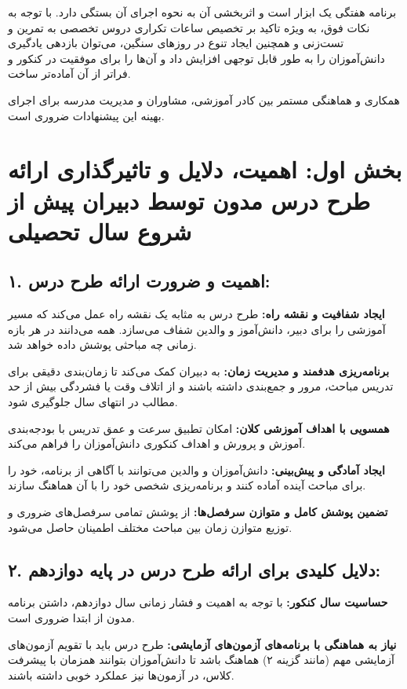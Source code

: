 \documentclass[a4paper,14pt]{article}
\begin{document}
برنامه هفتگی یک ابزار است و اثربخشی آن به نحوه اجرای آن بستگی دارد. با توجه به نکات فوق، به ویژه تاکید بر تخصیص ساعات تکراری دروس تخصصی به تمرین و تست‌زنی و همچنین ایجاد تنوع در روزهای سنگین، می‌توان بازدهی یادگیری دانش‌آموزان را به طور قابل توجهی افزایش داد و آن‌ها را برای موفقیت در کنکور و فراتر از آن آماده‌تر ساخت.

\medskip

همکاری و هماهنگی مستمر بین کادر آموزشی، مشاوران و مدیریت مدرسه برای اجرای بهینه این پیشنهادات ضروری است.
\newpage
\section*{بخش اول: اهمیت، دلایل و تاثیرگذاری ارائه طرح درس مدون توسط دبیران پیش از شروع سال تحصیلی}
\bigskip

\subsection*{۱. اهمیت و ضرورت ارائه طرح درس:}
\textbf{ایجاد شفافیت و نقشه راه:} طرح درس به مثابه یک نقشه راه عمل می‌کند که مسیر آموزشی را برای دبیر، دانش‌آموز و والدین شفاف می‌سازد. همه می‌دانند در هر بازه زمانی چه مباحثی پوشش داده خواهد شد.

\textbf{برنامه‌ریزی هدفمند و مدیریت زمان:} به دبیران کمک می‌کند تا زمان‌بندی دقیقی برای تدریس مباحث، مرور و جمع‌بندی داشته باشند و از اتلاف وقت یا فشردگی بیش از حد مطالب در انتهای سال جلوگیری شود.

\textbf{همسویی با اهداف آموزشی کلان:} امکان تطبیق سرعت و عمق تدریس با بودجه‌بندی آموزش و پرورش و اهداف کنکوری دانش‌آموزان را فراهم می‌کند.

\textbf{ایجاد آمادگی و پیش‌بینی:} دانش‌آموزان و والدین می‌توانند با آگاهی از برنامه، خود را برای مباحث آینده آماده کنند و برنامه‌ریزی شخصی خود را با آن هماهنگ سازند.

\textbf{تضمین پوشش کامل و متوازن سرفصل‌ها:} از پوشش تمامی سرفصل‌های ضروری و توزیع متوازن زمان بین مباحث مختلف اطمینان حاصل می‌شود.
\medskip

\subsection*{۲. دلایل کلیدی برای ارائه طرح درس در پایه دوازدهم:}
\textbf{حساسیت سال کنکور:} با توجه به اهمیت و فشار زمانی سال دوازدهم، داشتن برنامه مدون از ابتدا ضروری است.

\textbf{نیاز به هماهنگی با برنامه‌های آزمون‌های آزمایشی:} طرح درس باید با تقویم آزمون‌های آزمایشی مهم (مانند گزینه ۲) هماهنگ باشد تا دانش‌آموزان بتوانند همزمان با پیشرفت کلاس، در آزمون‌ها نیز عملکرد خوبی داشته باشند.
\end{document}
